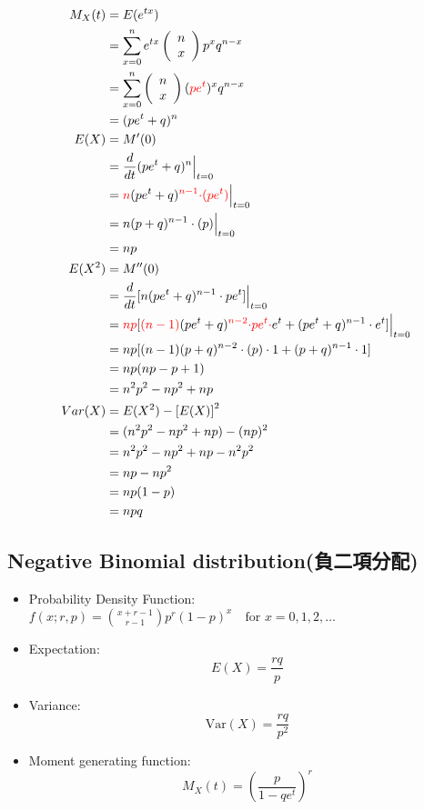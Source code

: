 \documentclass[12pt, a4paper]{article}
\begin{document}
\begin{align*}
M_{X}(t) &= E(e^{tx}) \\
         &= \sum_{\substack{x = 0 \\ }}^n e^{tx}\left(\begin{array}{c}n\\ x\end{array}\right)p^{x}q^{n-x} \\
         &=  \sum_{\substack{x = 0 \\ }}^n \left(\begin{array}{c}n\\ x\end{array}\right)(\textcolor{red}{pe^{t}})^{x}q^{n-x} \\
         &= (pe^{t}+q)^n \\
E(X)     &= M'(0)\\
         &= \frac{d}{dt}(pe^{t}+q)^n\Big|_{t=0}\\
         &= \textcolor{red}{n}(pe^{t}+q)^{\textcolor{red}{n-1}}\textcolor{red}{\cdot(pe^{t})}\Big|_{t=0}\\
         &= n(p+q)^{n-1}\cdot(p)\Big|_{t=0}\\
         &=np\\
E(X^2)   &=M''(0)\\
         &=\frac{d}{dt}[n(pe^{t}+q)^{n-1}\cdot pe^t]\Big|_{t=0}\\
         &=\textcolor{red}{np}[\textcolor{red}{(n-1)}(pe^{t}+q)^{\textcolor{red}{n-2}}{\textcolor{red}{\cdot pe^t \cdot}}e^t+(pe^{t}+q)^{n-1}\cdot e^t]\Big|_{t=0}\\
         &=np[(n-1)(p+q)^{n-2}\cdot(p)\cdot 1+(p+q)^{n-1}\cdot 1]\\
         &=np(np-p+1)\\
         &=n^2p^2-np^2+np\\
Var(X)   &=E(X^2)-\left[E(X)\right]^2\\
         &=(n^2p^2-np^2+np)-(np)^2\\
         &=n^2p^2-np^2+np-n^2p^2\\
         &=np-np^2\\
         &=np(1-p)\\
         &=npq
\end{align*}
\subsection{Negative Binomial distribution(負二項分配)}
\begin{itemize}
\item Probability Density Function:${\displaystyle f(x;r,p)={\binom {x+r-1}{r-1}}p^{r}(1-p)^{x}\quad {\text{for }}x=0,1,2,\dotsc }$
\item Expectation:$$E(X) = \frac{rq}{p}$$
\item Variance:$$\text{Var}(X) = \frac{rq}{p^2}$$
\item Moment generating function:$$M_X(t) = \left({\frac  {p}{1-qe^{t}}}\right)^{r}\!$$
\end{itemize}
\end{document}
